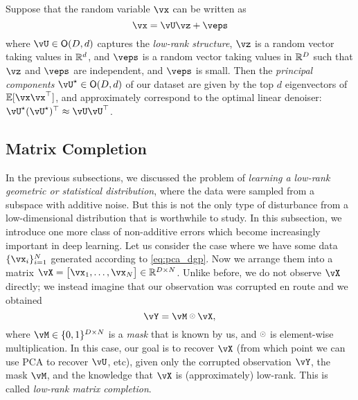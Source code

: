 \documentclass[../../book-main.tex]{subfiles}
\begin{document}
\begin{theorem}\label{thm:ppca}
    Suppose that the random variable \(\vx\) can be written as
    \begin{equation}
        \vx = \vU\vz + \veps
    \end{equation}
    where \(\vU \in \O(D, d)\) captures the \textit{low-rank structure}, \(\vz\)
    is a random vector taking values in \(\mathbb{R}^{d}\), and \(\veps\) is a random
    vector taking values in \(\mathbb{R}^{D}\) such that \(\vz\) and \(\veps\) are
    independent, and \(\veps\) is small. Then the \textit{principal components}
    \(\vU^{\star} \in \O(D, d)\) of our dataset are given by the top \(d\)
    eigenvectors of \(\Ex[\vx\vx^{\top}]\), and approximately correspond to the
    optimal linear denoiser: \(\vU^{\star}(\vU^{\star})^{\top} \approx \vU\vU^{\top}\).
\end{theorem}



\subsection{Matrix Completion}

In the previous subsections, we discussed the problem of \textit{learning a low-rank geometric or statistical distribution}, where the data were sampled from a subspace with additive noise. But this is not the only type of disturbance from a low-dimensional distribution that is worthwhile to study. In this subsection, we introduce one more class of non-additive errors which become increasingly important in deep learning. Let us consider the case where we have some data \(\{\vx_{i}\}_{i = 1}^{N}\) generated according to \eqref{eq:pca_dgp}. Now we arrange them into a matrix \(\vX = \mat{\vx_{1}, \dots, \vx_{N}} \in \R^{D \times N}\). Unlike before, we do not observe \(\vX\) directly; we instead imagine that our observation was corrupted en route and we obtained 
\begin{equation}
    \vY = \vM \hada \vX,
\end{equation}
where \(\vM \in \{0, 1\}^{D \times N}\) is a \textit{mask} that is known by us,
and \(\hada\) is element-wise multiplication. In this case, our goal is to recover \(\vX\) (from which point we can use PCA to recover \(\vU\), etc), given only the corrupted observation \(\vY\), the mask \(\vM\), and the knowledge that \(\vX\) is (approximately) low-rank. This is called \textit{low-rank matrix completion}.
\end{document}
